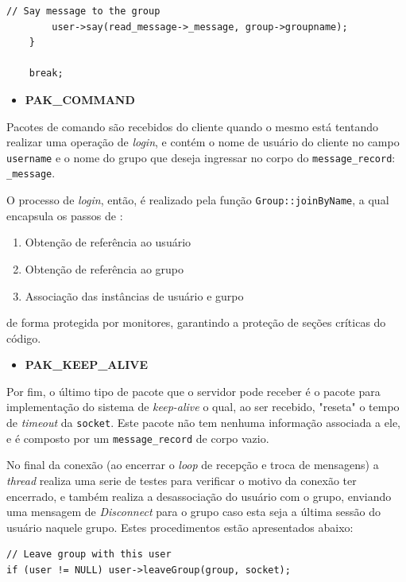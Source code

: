 \documentclass{article}
\begin{document}
\begin{itemize}
\begin{lstlisting}[xleftmargin=-.1\textwidth, xrightmargin=-.1\textwidth]
        // Say message to the group
        user->say(read_message->_message, group->groupname);
    }
    
    break;
\end{lstlisting}
\begin{itemize}
    \item \textbf{PAK\_COMMAND}
\end{itemize}
\par Pacotes de comando são recebidos do cliente quando o mesmo está tentando realizar uma operação de \textit{login}, e contém o nome de usuário do cliente no campo \texttt{username} e o nome do grupo que deseja ingressar no corpo do \texttt{message\_record}: \texttt{\_message}.
\par O processo de \textit{login}, então, é realizado pela função \texttt{Group::joinByName}, a qual encapsula os passos de :
\begin{enumerate}
    \item Obtenção de referência ao usuário
    \item Obtenção de referência ao grupo
    \item Associação das instâncias de usuário e gurpo
\end{enumerate}
de forma protegida por monitores, garantindo a proteção de seções críticas do código.

\begin{itemize}
    \item \textbf{PAK\_KEEP\_ALIVE}
\end{itemize}
\par Por fim, o último tipo de pacote que o servidor pode receber é o pacote para implementação do sistema de \textit{keep-alive} o qual, ao ser recebido, "reseta" o tempo de \textit{timeout} da \texttt{socket}. Este pacote não tem nenhuma informação associada a ele, e é composto por um \texttt{message\_record} de corpo vazio.
\\
%
\par No final da conexão (ao encerrar o \textit{loop} de recepção e troca de mensagens) a \textit{thread} realiza uma serie de testes para verificar o motivo da conexão ter encerrado, e também realiza a desassociação do usuário com o grupo, enviando uma mensagem de \textit{Disconnect} para o grupo caso esta seja a última sessão do usuário naquele grupo. Estes procedimentos estão apresentados abaixo:
\begin{lstlisting}[xleftmargin=-.2\textwidth, xrightmargin=-.2\textwidth]
// Leave group with this user
if (user != NULL) user->leaveGroup(group, socket);


\end{lstlisting}
\end{itemize}
\end{document}
